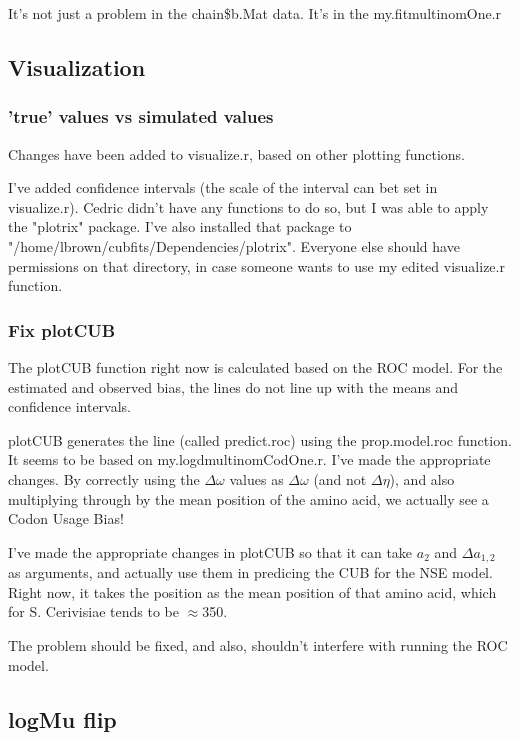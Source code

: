 It's not just a problem in the chain\$b.Mat data. It's in the my.fitmultinomOne.r


\subsection{Visualization}

\subsubsection{'true' values vs simulated values}

Changes have been added to visualize.r, based on other plotting functions.

I've added confidence intervals (the scale of the interval can bet set in visualize.r). Cedric didn't have any functions to do so, but I was able to apply the "plotrix" package. I've also installed that package to "/home/lbrown/cubfits/Dependencies/plotrix". Everyone else should have permissions on that directory, in case someone wants to use my edited visualize.r function.


\subsubsection{Fix plotCUB}

The plotCUB function right now is calculated based on the ROC model. For the estimated and observed bias, the lines do not line up with the means and confidence intervals.

plotCUB generates the line (called predict.roc) using the prop.model.roc function. It seems to be based on my.logdmultinomCodOne.r. I've made the appropriate changes. By correctly using the $\Delta\omega$ values as $\Delta\omega$ (and not $\Delta\eta$), and also multiplying through by the mean position of the amino acid, we actually see a Codon Usage Bias!

I've made the appropriate changes in plotCUB so that it can take $a_2$ and $\Delta a_{1,2}$ as arguments, and actually use them in predicing the CUB for the NSE model. Right now, it takes the position as the mean position of that amino acid, which for S. Cerivisiae tends to be $\approx$350. 

The problem should be fixed, and also, shouldn't interfere with running the ROC model.


\subsection{logMu flip}

